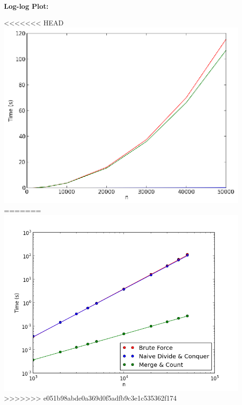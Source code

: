 \documentclass[letterpaper,10pt,titlepage,fleqn]{article}
\begin{document}
\textbf{Log-log Plot:}
\vskip 0.04in
\begin{center}
<<<<<<< HEAD
  \includegraphics[width=5in]{input_time.ps}
=======
  \includegraphics[width=5in]{loglog.png}
>>>>>>> e051b98abde0a369d0f5adfb9c3e1c535362f174
\end{center}
\end{document}
